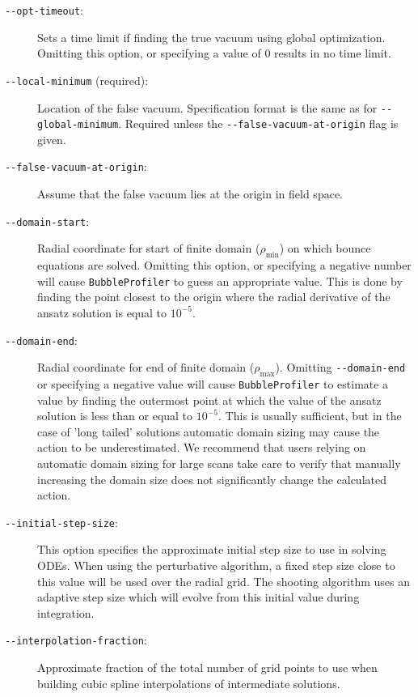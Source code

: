 \documentclass[final,3p,11pt,pdflatex]{elsarticle}
\makeatletter
\newcommand{\bp}{\texttt{BubbleProfiler}\@\xspace}
\newcommand{\code}[1]{\ifmmode\text{\nolinkurl{#1}}\else\nolinkurl{#1}\fi}
\newcommand{\rhomin}{\ensuremath{\rho_{\text{min}}}}
\newcommand{\rhomax}{\ensuremath{\rho_{\text{max}}}}
\makeatother
\begin{document}
\begin{description}
\item[\texttt{-\/-opt-timeout}:] Sets a time limit if finding the true vacuum
  using global optimization. Omitting this option, or specifying a value of
  $0$ results in no time limit.

\item[\texttt{-\/-local-minimum} (required):] Location of the false vacuum.
  Specification format is the same as for \code{--global-minimum}. Required
  unless the \texttt{-\/-false-vacuum-at-origin} flag is given.

\item[\texttt{-\/-false-vacuum-at-origin}:] Assume that the false vacuum lies
  at the origin in field space.

\item[\texttt{-\/-domain-start}:] Radial coordinate for start of finite domain
  ($\rhomin$) on which bounce equations are solved. Omitting this option, or
  specifying a negative number will cause \bp to guess an
  appropriate value. This is done by finding the point closest to the origin
  where the radial derivative of the ansatz solution is equal to $10^{-5}$.

\item[\texttt{-\/-domain-end}:] Radial coordinate for end of finite domain
  ($\rhomax$). Omitting \texttt{-\/-domain-end} or specifying a negative value
  will cause \bp to estimate a value by finding the outermost point
  at which the value of the ansatz solution is less than or equal to $10^{-5}$.
  This is usually sufficient, but in the case of 'long tailed' solutions
  automatic domain sizing may cause the action to be underestimated.  We
  recommend that users relying on automatic domain sizing for large scans
  take care to verify that manually increasing the domain size does not
  significantly change the calculated action.

\item[\texttt{-\/-initial-step-size}:] This option specifies the approximate initial step size to use in solving ODEs. When using the perturbative algorithm, a fixed step size close to this value will be used over the radial grid. The shooting algorithm uses an adaptive step size which will evolve from this initial value during integration.

\item[\texttt{-\/-interpolation-fraction}:] Approximate fraction of the total
  number of grid points to use when building cubic spline interpolations of
  intermediate solutions.


\end{description}
\end{document}
